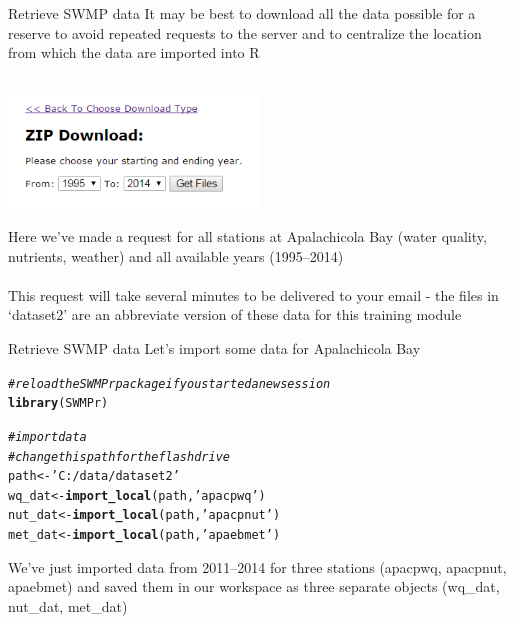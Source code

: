 \documentclass[xcolor=svgnames]{beamer}\usepackage[]{graphicx}\usepackage[]{color}
\makeatletter
\newcommand{\hlstr}[1]{\textcolor[rgb]{0.192,0.494,0.8}{#1}}%
\newcommand{\hlcom}[1]{\textcolor[rgb]{0.678,0.584,0.686}{\textit{#1}}}%
\newcommand{\hlstd}[1]{\textcolor[rgb]{0.345,0.345,0.345}{#1}}%
\newcommand{\hlkwb}[1]{\textcolor[rgb]{0.69,0.353,0.396}{#1}}%
\newcommand{\hlkwd}[1]{\textcolor[rgb]{0.737,0.353,0.396}{\textbf{#1}}}%
\newenvironment{kframe}{%
 \def\at@end@of@kframe{}%
 \ifinner\ifhmode%
  \def\at@end@of@kframe{\end{minipage}}%
  \begin{minipage}{\columnwidth}%
 \fi\fi%
 \def\FrameCommand##1{\hskip\@totalleftmargin \hskip-\fboxsep
 \colorbox{shadecolor}{##1}\hskip-\fboxsep
     \hskip-\linewidth \hskip-\@totalleftmargin \hskip\columnwidth}%
 \MakeFramed {\advance\hsize-\width
   \@totalleftmargin\z@ \linewidth\hsize
   \@setminipage}}%
 {\par\unskip\endMakeFramed%
 \at@end@of@kframe}
\newenvironment{knitrout}{}{} %
\makeatother
\begin{document}
\begin{frame}[t]{Retrieve SWMP data}
It may be best to download all the data possible for a reserve to avoid repeated requests to the server and to centralize the location from which the data are imported into R \\~\\
\centerline{\includegraphics[width = 0.5\textwidth]{zip_eda2.png}}
Here we've made a request for all stations at Apalachicola Bay (water quality, nutrients, weather) and all available years (1995--2014) \\~\\
This request will take several minutes to be delivered to your email - the files in `dataset2' are an abbreviate version of these data for this training module
\end{frame}

\begin{frame}[containsverbatim]{Retrieve SWMP data}
Let's import some data for Apalachicola Bay

\begin{knitrout}\scriptsize
{}\color{fgcolor}\begin{kframe}
\begin{alltt}
\hlcom{# reload the SWMPr package if you started a new session}
\hlkwd{library}\hlstd{(SWMPr)}

\hlcom{# import data}
\hlcom{# change this path for the flash drive}
\hlstd{path} \hlkwb{<-} \hlstr{'C:/data/dataset2'}
\hlstd{wq_dat} \hlkwb{<-} \hlkwd{import_local}\hlstd{(path,} \hlstr{'apacpwq'}\hlstd{)}
\hlstd{nut_dat} \hlkwb{<-} \hlkwd{import_local}\hlstd{(path,} \hlstr{'apacpnut'}\hlstd{)}
\hlstd{met_dat} \hlkwb{<-} \hlkwd{import_local}\hlstd{(path,} \hlstr{'apaebmet'}\hlstd{)}
\end{alltt}
\end{kframe}
\end{knitrout}
We've just imported data from 2011--2014 for three stations (apacpwq, apacpnut, apaebmet) and saved them in our workspace as three separate objects (wq\_dat, nut\_dat, met\_dat)
\end{frame}
\end{document}
